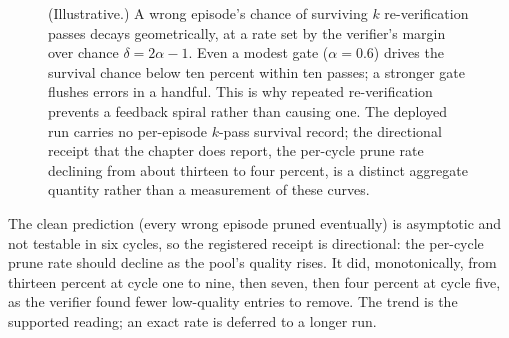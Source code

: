 \begin{figure}[htbp]
\centering
{}
\caption[Self-correction]{(Illustrative.) A wrong episode's chance of surviving $k$
re-verification passes decays geometrically, at a rate set by the verifier's margin over
chance $\delta = 2\alpha-1$. Even a modest gate ($\alpha=0.6$) drives the survival chance
below ten percent within ten passes; a stronger gate flushes errors in a handful. This is
why repeated re-verification prevents a feedback spiral rather than causing one. The
deployed run carries no per-episode $k$-pass survival record; the directional receipt that
the chapter does report, the per-cycle prune rate declining from about thirteen to four
percent, is a distinct aggregate quantity rather than a measurement of these curves.}
\label{fig:selfcorrect}
\end{figure}

\begin{bythenumbers}
The clean prediction (every wrong episode pruned eventually) is asymptotic and not testable
in six cycles, so the registered receipt is directional: the per-cycle prune rate should
decline as the pool's quality rises. It did, monotonically, from thirteen percent at cycle
one to nine, then seven, then four percent at cycle five, as the verifier found fewer
low-quality entries to remove. The trend is the supported reading; an exact rate is deferred
to a longer run.
\end{bythenumbers}

